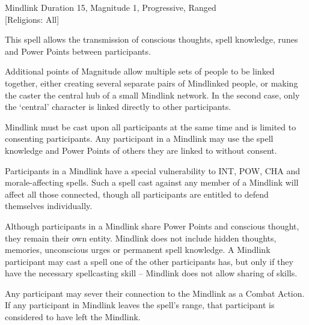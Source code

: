\begin{samepage}
\begin{rpg-spell}
{Mindlink}
{Duration 15, Magnitude 1, Progressive, Ranged\\{[Religions: All]}}

This spell allows the transmission of conscious thoughts, spell knowledge, runes and Power Points between participants. 

Additional points of Magnitude allow multiple sets of people to be linked together, either creating several separate pairs of Mindlinked people, or making the caster the central hub of a small Mindlink network. In the second case, only the ‘central’ character is linked directly to other participants. 

Mindlink must be cast upon all participants at the same time and is limited to consenting participants. Any participant in a Mindlink may use the spell knowledge and Power Points of others they are linked to without consent. 

Participants in a Mindlink have a special vulnerability to INT, POW, CHA and morale-affecting spells. Such a spell cast against any member of a Mindlink will affect all those connected, though all participants are entitled to defend themselves individually. 

Although participants in a Mindlink share Power Points and conscious thought, they remain their own entity. Mindlink does not include hidden thoughts, memories, unconscious urges or permanent spell knowledge. A Mindlink participant may cast a spell one of the other participants has, but only if they have the necessary spellcasting skill – Mindlink does not allow sharing of skills. 

Any participant may sever their connection to the Mindlink as a Combat Action. If any participant in Mindlink leaves the spell’s range, that participant is considered to have left the Mindlink. 
\end{rpg-spell}
\end{samepage}

